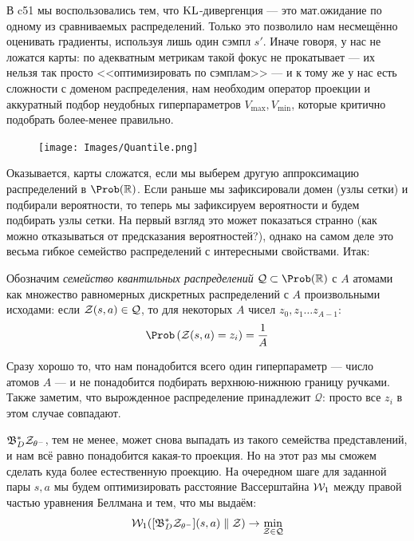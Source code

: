 В c51 мы воспользовались тем, что $\operatorname{KL}$-дивергенция --- это мат.ожидание по одному из сравниваемых распределений. Только это позволило нам несмещённо оценивать градиенты, используя лишь один сэмпл $s'$. Иначе говоря, у нас не ложатся карты: по адекватным метрикам такой фокус не прокатывает --- их нельзя так просто <<оптимизировать по сэмплам>> --- и к тому же у нас есть сложности с доменом распределения, нам необходим оператор проекции и аккуратный подбор неудобных гиперпараметров $V_{\max}, V_{\min}$, которые критично подобрать более-менее правильно.

\begin{figure}
\vspace{-0.3cm}
\centering
\texttt{[image: Images/Quantile.png]}
\vspace{-1.4cm}
\end{figure}

Оказывается, карты сложатся, если мы выберем другую аппроксимацию распределений в $\Prob (\R)$. Если раньше мы зафиксировали домен (узлы сетки) и подбирали вероятности, то теперь мы зафиксируем вероятности и будем подбирать узлы сетки. На первый взгляд это может показаться странно (как можно отказываться от предсказания вероятностей?), однако на самом деле это весьма гибкое семейство распределений с интересными свойствами. Итак:

\begin{definition}
Обозначим \emph{семейство квантильных распределений} $\mathcal{Q} \subset \Prob(\R)$ с $A$ атомами как множество равномерных дискретных распределений с $A$ произвольными исходами: если $\mathcal{Z}(s, a) \in \mathcal{Q}$, то для некоторых $A$ чисел $z_0, z_1 \dots z_{A-1} \colon$
$$\Prob \left( \Z(s, a) = z_i \right) = \frac{1}{A}$$
\end{definition}

Сразу хорошо то, что нам понадобится всего один гиперпараметр --- число атомов $A$ --- и не понадобится подбирать верхнюю-нижнюю границу ручками. Также заметим, что вырожденное распределение принадлежит $\mathcal{Q}$: просто все $z_i$ в этом случае совпадают.

$\mathfrak{B}^*_D \mathcal{Z}_{\theta^-}$, тем не менее, может снова выпадать из такого семейства представлений, и нам всё равно понадобится какая-то проекция. Но на этот раз мы сможем сделать куда более естественную проекцию. На очередном шаге для заданной пары $s, a$ мы будем оптимизировать расстояние Вассерштайна $\mathcal{W}_1$ между правой частью уравнения Беллмана и тем, что мы выдаём:
\begin{equation}\label{qprojection}
\mathcal{W}_1 ([\mathfrak{B}^*_D \mathcal{Z}_{\theta^-}](s, a) \parallel \mathcal{Z}) \to \min_{\mathcal{Z} \in \mathcal{Q}}
\end{equation}

